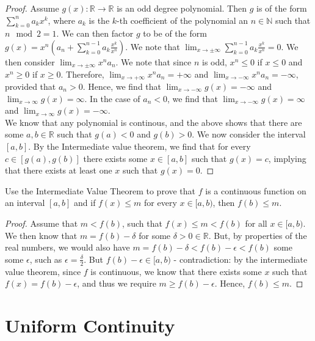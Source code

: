\documentclass[12pt]{book}
\newcommand{\N}{\mathbb{N}}
\newcommand{\R}{\mathbb{R}}
\newenvironment{exercise}[2][Exercise]{\begin{trivlist}
\item[\hskip \labelsep {\bfseries #1}\hskip \labelsep {\bfseries #2.}]}{\end{trivlist}}
\begin{document}
\begin{exercise}{1.4.6}
\begin{exercise}{3.2.11}
	\begin{proof}
	Assume $g(x): \R \to \R$ is an odd degree polynomial. Then $g$ is of the form $\sum_{k=0}^{n} a_k x^k$, where $a_k$ is the $k$-th coefficient of the polynomial an $n \in \N$ such that $n \mod 2 = 1$. We can then factor $g$ to be of the form $g(x)= x^n (a_n + \sum_{k=0}^{n-1} a_k \frac{x^k}{x^n} )$. We note that $\lim_{x \to \pm \infty} \sum_{k=0}^{n-1} a_k \frac{x^k}{x^n}  = 0$. We then consider $\lim_{x \to \pm \infty} x^n a_n$. We note that since $n$ is odd, $x^n \leq 0$ if $x \leq 0$ and $x^n \geq 0$ if $x \geq 0$. Therefore, $\lim_{x \to +\infty} x^n a_n = + \infty$ and $\lim_{x \to -\infty} x^n a_n = -\infty$, provided that $a_n > 0$. Hence, we find that $\lim_{x \to - \infty} g(x) = - \infty$ and $\lim_{x \to \infty} g(x) = \infty$. In the case of $a_n < 0$, we find that $\lim_{x \to -\infty} g(x) = \infty$ and $\lim_{x \to \infty} g(x)= -\infty$. \\
	We know that any polynomial is continous, and the above shows that there are some $a,b \in \R$ such that $g(a) < 0$ and $g(b) > 0$. We now consider the interval $[a,b]$. By the Intermediate value theorem, we find that for every $c \in [g(a),g(b)]$ there exists some $x \in [a,b]$ such that $g(x)=c$, implying that there exists at least one $x$ such that $g(x)=0$. 
	\end{proof}
\end{exercise}



\begin{exercise}{3.2.12}
Use the Intermediate Value Theorem to prove that $f$ is a continuous function on an interval $[a,b]$ and if $f(x) \leq m$ for every $x \in [a,b)$, then $f(b) \leq m$.
	\begin{proof}
	Assume that $m < f(b)$, such that $f(x) \leq m < f(b)$ for all $x \in [a,b)$. We then know that $m = f(b)- \delta$ for some $\delta > 0 \in \R$. But, by properties of the real numbers, we would also have $m = f(b) - \delta < f(b) - \epsilon < f(b)$ some some $\epsilon$, such as $\epsilon = \frac{\delta}{2}$. But $f(b)- \epsilon \in [a,b)$ - contradiction: by the intermediate value theorem, since $f$ is continuous, we know that there exists some $x$ such that $f(x)= f(b) - \epsilon$, and thus we require $m \geq f(b) - \epsilon$. Hence, $f(b) \leq m$.
	\end{proof}
\end{exercise}



\section{Uniform Continuity}


\end{exercise}
\end{document}
